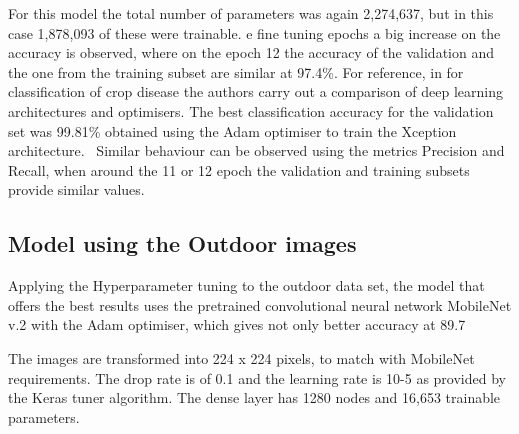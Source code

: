 \documentclass[conference]{IEEEtran}
\begin{document}
For this model the total number of parameters was again 2,274,637, but in this case 1,878,093 of these were trainable. e fine tuning epochs a big increase on the accuracy is observed, where on the epoch 12 the accuracy of the validation and the one from the training subset are similar at 97.4\%. For reference, in\cite{saleem2020plant} for classification of crop disease the authors carry out a comparison of deep learning architectures and optimisers. The best classification accuracy for the validation set was 99.81\% obtained using the Adam optimiser to train the Xception architecture. \
Similar behaviour can be observed using the metrics Precision and Recall, when around the 11 or 12 epoch the validation and training subsets provide similar values. 

\subsection{Model using the Outdoor images}

Applying the Hyperparameter tuning to the outdoor data set, the model that offers the best results uses the pretrained convolutional neural network MobileNet v.2 with the Adam optimiser, which gives not only better accuracy at 89.7%

The images are transformed into 224 x 224 pixels, to match with MobileNet requirements. The drop rate is of 0.1 and the learning rate is 10-5 as provided by the Keras tuner algorithm. The dense layer has 1280 nodes and 16,653 trainable parameters. 
\end{document}
